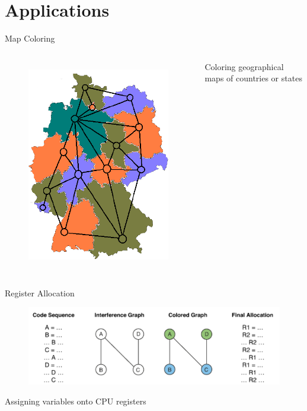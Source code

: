 \documentclass[12pt]{beamer}
\begin{document}
	\section{Applications}
	\begin{frame}{Map Coloring}
		\begin{columns}
			\centering
			\begin{figure}
				\centering
				\includegraphics[scale=0.3]{diagrams/maps.png}
				\label{fig:maps}
			\end{figure}
			\centering
			Coloring geographical maps of countries or states
		\end{columns}
	\end{frame}
	
	\begin{frame}{Register Allocation}
		\begin{figure}
			\centering
			\includegraphics[scale=0.5]{diagrams/register_cropped.png}
			\label{fig:regs}
		\end{figure}
		\vspace{1cm}
		\centering
		Assigning variables onto CPU registers
	\end{frame}
	
\end{document}
